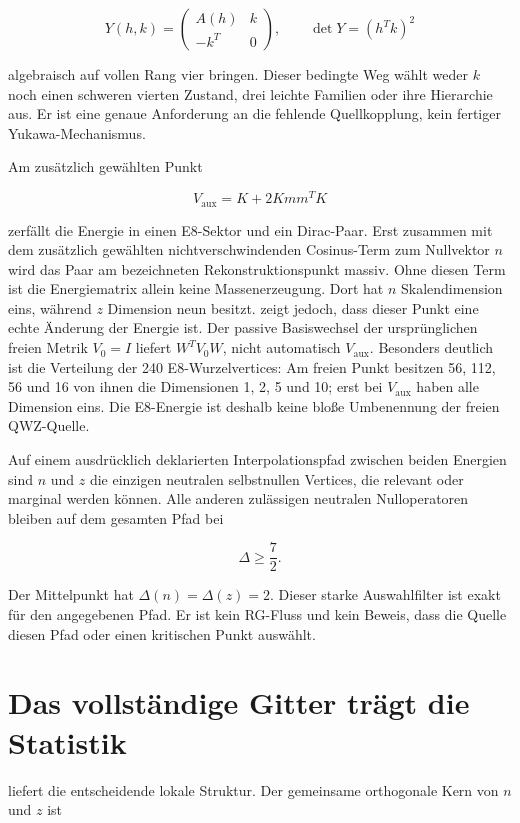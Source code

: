 \[
Y(h,k)=\begin{pmatrix}A(h)&k\\-k^T&0\end{pmatrix},
\qquad \det Y=(h^Tk)^2
\]

algebraisch auf vollen Rang vier bringen. Dieser bedingte Weg wählt weder \(k\) noch einen schweren vierten Zustand, drei leichte Familien oder ihre Hierarchie aus. Er ist eine genaue Anforderung an die fehlende Quellkopplung, kein fertiger Yukawa-Mechanismus. 

Am zusätzlich gewählten Punkt

\[
V_\mathrm{aux}=K+2Kmm^TK
\]

zerfällt die Energie in einen E8-Sektor und ein Dirac-Paar. Erst zusammen mit dem zusätzlich gewählten nichtverschwindenden Cosinus-Term zum Nullvektor $n$ wird das Paar am bezeichneten Rekonstruktionspunkt massiv. Ohne diesen Term ist die Energiematrix allein keine Massenerzeugung. Dort hat \(n\) Skalendimension eins, während \(z\) Dimension neun besitzt.  zeigt jedoch, dass dieser Punkt eine echte Änderung der Energie ist. Der passive Basiswechsel der ursprünglichen freien Metrik \(V_0=I\) liefert \(W^TV_0W\), nicht automatisch \(V_\mathrm{aux}\). Besonders deutlich ist die Verteilung der 240 E8-Wurzelvertices: Am freien Punkt besitzen 56, 112, 56 und 16 von ihnen die Dimensionen 1, 2, 5 und 10; erst bei \(V_\mathrm{aux}\) haben alle Dimension eins. Die E8-Energie ist deshalb keine bloße Umbenennung der freien QWZ-Quelle.

Auf einem ausdrücklich deklarierten Interpolationspfad zwischen beiden Energien sind \(n\) und \(z\) die einzigen neutralen selbstnullen Vertices, die relevant oder marginal werden können. Alle anderen zulässigen neutralen Nulloperatoren bleiben auf dem gesamten Pfad bei

\[
\Delta\geq \frac72.
\]

Der Mittelpunkt hat \(\Delta(n)=\Delta(z)=2\). Dieser starke Auswahlfilter ist exakt für den angegebenen Pfad. Er ist kein RG-Fluss und kein Beweis, dass die Quelle diesen Pfad oder einen kritischen Punkt auswählt.

\section{Das vollständige Gitter trägt die Statistik}

 liefert die entscheidende lokale Struktur. Der gemeinsame orthogonale Kern von \(n\) und \(z\) ist

